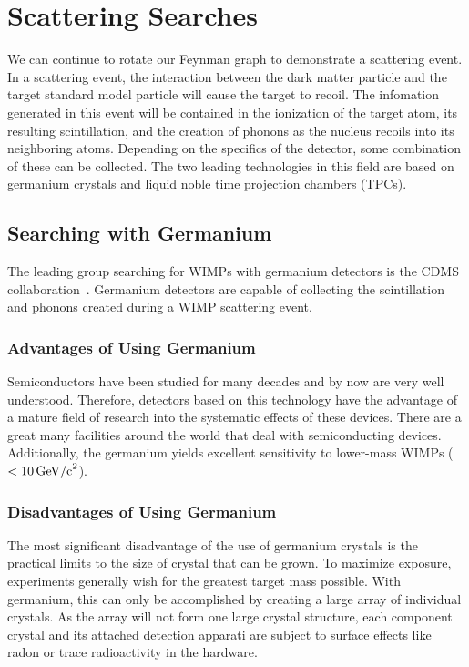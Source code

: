 \section{Scattering Searches}

We can continue to rotate our Feynman graph to demonstrate a scattering event. In a scattering event, the interaction between the dark matter particle and the target standard model particle will cause the target to recoil. The infomation generated in this event will be contained in the ionization of the target atom, its resulting scintillation, and the creation of phonons as the nucleus recoils into its neighboring atoms. Depending on the specifics of the detector, some combination of these can be collected. The two leading technologies in this field are based on germanium crystals and liquid noble time projection chambers (TPCs).

\subsection{Searching with Germanium}

The leading group searching for WIMPs with germanium detectors is the CDMS collaboration~\cite{}. Germanium detectors are capable of collecting the scintillation and phonons created during a WIMP scattering event.

\subsubsection{Advantages of Using Germanium}

Semiconductors have been studied for many decades and by now are very well understood. Therefore, detectors based on this technology have the advantage of a mature field of research into the systematic effects of these devices. There are a great many facilities around the world that deal with semiconducting devices. Additionally, the germanium yields excellent sensitivity to lower-mass WIMPs ($<10\, \mathrm{GeV/c}^2$).

\subsubsection{Disadvantages of Using Germanium}

The most significant disadvantage of the use of germanium crystals is the practical limits to the size of crystal that can be grown. To maximize exposure, experiments generally wish for the greatest target mass possible. With germanium, this can only be accomplished by creating a large array of individual crystals. As the array will not form one large crystal structure, each component crystal and its attached detection apparati are subject to surface effects like radon or trace radioactivity in the hardware.

